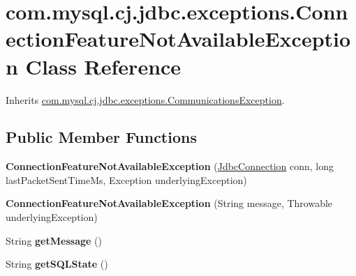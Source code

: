 \hypertarget{classcom_1_1mysql_1_1cj_1_1jdbc_1_1exceptions_1_1_connection_feature_not_available_exception}{}\section{com.\+mysql.\+cj.\+jdbc.\+exceptions.\+Connection\+Feature\+Not\+Available\+Exception Class Reference}
\label{classcom_1_1mysql_1_1cj_1_1jdbc_1_1exceptions_1_1_connection_feature_not_available_exception}


Inherits \mbox{\hyperlink{classcom_1_1mysql_1_1cj_1_1jdbc_1_1exceptions_1_1_communications_exception}{com.\+mysql.\+cj.\+jdbc.\+exceptions.\+Communications\+Exception}}.

\subsection*{Public Member Functions}
\begin{DoxyCompactItemize}
\item 
\mbox{\label{classcom_1_1mysql_1_1cj_1_1jdbc_1_1exceptions_1_1_connection_feature_not_available_exception_aa1d0a3f13ee9d6837d7183244ee76058}} 
{\bfseries Connection\+Feature\+Not\+Available\+Exception} (\mbox{\hyperlink{interfacecom_1_1mysql_1_1cj_1_1jdbc_1_1_jdbc_connection}{Jdbc\+Connection}} conn, long last\+Packet\+Sent\+Time\+Ms, Exception underlying\+Exception)
\item 
\mbox{\label{classcom_1_1mysql_1_1cj_1_1jdbc_1_1exceptions_1_1_connection_feature_not_available_exception_a2a8ec127394d86b606a63d19badde154}} 
{\bfseries Connection\+Feature\+Not\+Available\+Exception} (String message, Throwable underlying\+Exception)
\item 
\mbox{\label{classcom_1_1mysql_1_1cj_1_1jdbc_1_1exceptions_1_1_connection_feature_not_available_exception_a27d6774599a3620d41fc3b9684cc5cc7}} 
String {\bfseries get\+Message} ()
\item 
\mbox{\label{classcom_1_1mysql_1_1cj_1_1jdbc_1_1exceptions_1_1_connection_feature_not_available_exception_ad35b6c8b062fc83e7b85ea7cec09880e}} 
String {\bfseries get\+S\+Q\+L\+State} ()
\end{DoxyCompactItemize}


